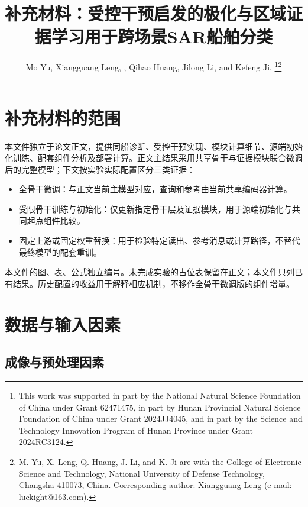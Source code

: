 \documentclass[journal,10pt,a4paper]{IEEEtran}
\providecommand{\tightlist}{\setlength{\itemsep}{0pt}\setlength{\parskip}{0pt}}
\begin{document}
\title{补充材料：受控干预启发的极化与区域证据学习用于跨场景SAR船舶分类}\author{Mo Yu, Xiangguang Leng, , Qihao Huang, Jilong Li, and Kefeng Ji, \thanks{This work was supported in part by the National Natural Science Foundation of China under Grant 62471475, in part by Hunan Provincial Natural Science Foundation of China under Grant 2024JJ4045, and in part by the Science and Technology Innovation Program of Hunan Province under Grant 2024RC3124.}\thanks{M. Yu, X. Leng, Q. Huang, J. Li, and K. Ji are with the College of Electronic Science and Technology, National University of Defense Technology, Changsha 410073, China. Corresponding author: Xiangguang Leng (e-mail: luckight@163.com).}}\maketitle

\section{补充材料的范围}\label{ux8865ux5145ux6750ux6599ux7684ux8303ux56f4}

本文件独立于论文正文，提供同船诊断、受控干预实现、模块计算细节、源端初始化训练、配套组件分析及部署计算。正文主结果采用共享骨干与证据模块联合微调后的完整模型；下文按实验实际配置区分三类证据：

\begin{itemize}
\tightlist
\item
  全骨干微调：与正文当前主模型对应，查询和参考由当前共享编码器计算。
\item
  受限骨干训练与初始化：仅更新指定骨干层及证据模块，用于源端初始化与共同起点组件比较。
\item
  固定上游或固定权重替换：用于检验特定读出、参考消息或计算路径，不替代最终模型的配套重训。
\end{itemize}

本文件的图、表、公式独立编号。未完成实验的占位表保留在正文；本文件只列已有结果。历史配置的收益用于解释相应机制，不移作全骨干微调版的组件增量。

\section{数据与输入因素}\label{ux6570ux636eux4e0eux8f93ux5165ux56e0ux7d20}

\subsection{成像与预处理因素}\label{ux6210ux50cfux4e0eux9884ux5904ux7406ux56e0ux7d20}
\end{document}
